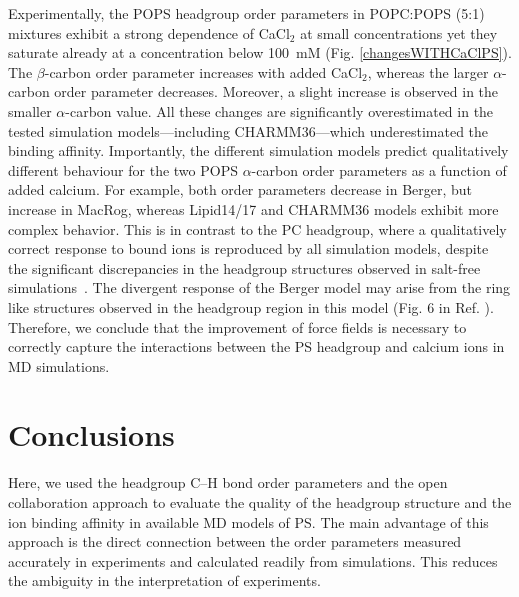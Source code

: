 \documentclass[aps,prl,superscriptaddress,twocolumn]{revtex4}
\begin{document}
Experimentally, the POPS headgroup order parameters in POPC:POPS (5:1) mixtures
exhibit a strong dependence of CaCl$_2$ at small concentrations yet they saturate already at a concentration below 100~mM (Fig. \ref{changesWITHCaClPS}).
The $\beta$-carbon order parameter increases with added CaCl$_2$,
whereas the larger $\alpha$-carbon order parameter decreases. Moreover, a slight increase is observed in
the smaller $\alpha$-carbon value. All these changes are significantly overestimated in the
tested simulation models---including CHARMM36---which underestimated the binding affinity.
Importantly, the different simulation models predict qualitatively different behaviour
for the two POPS $\alpha$-carbon order parameters as a function of added calcium.
For example, both order parameters decrease in Berger, but increase
in MacRog, whereas Lipid14/17 and CHARMM36 models exhibit more complex behavior.
This is in contrast to the PC headgroup, where a
qualitatively correct response to bound ions is reproduced
by all simulation models, despite the significant discrepancies in the headgroup
structures observed in salt-free simulations~\cite{catte16}.
The divergent response of the Berger model may arise from the ring like structures
observed in the headgroup region in this model (Fig. 6 in Ref. ).
Therefore, we conclude that
the improvement of force fields is necessary to correctly capture the interactions between the
PS headgroup and calcium ions in MD simulations.

\section{Conclusions}

Here, we used the headgroup C--H bond order parameters and the open collaboration approach to evaluate the quality
of the headgroup structure and the ion binding affinity 
in available MD models of PS.
The main advantage of this approach is the direct connection
between the order parameters measured accurately in experiments and calculated readily from simulations. 
This reduces the ambiguity in the interpretation of experiments.
\end{document}
